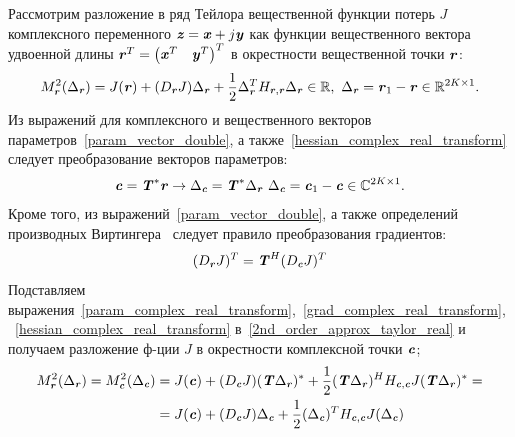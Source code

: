 Рассмотрим разложение в ряд Тейлора вещественной функции потерь $J$ комплексного переменного $\textbf{\textit{z}}=\textbf{\textit{x}}+j\textbf{\textit{y}}$ как функции вещественного вектора удвоенной длины $\textbf{\textit{r}}^T=\begin{pmatrix}
	\textbf{\textit{x}}^T & \textbf{\textit{y}}^T
\end{pmatrix}^T$ в окрестности вещественной точки $\textbf{\textit{r}}$:
\begin{align}
	M^2_{\textbf{\textit{r}}}(\Delta_{\textbf{\textit{r}}})=
	J(\textbf{\textit{r}})+(D_{\textbf{\textit{r}}}J)\Delta_{\textbf{\textit{r}}}+
	\frac{1}{2}\Delta_{\textbf{\textit{r}}}^T H_{\textbf{\textit{r}},\textbf{\textit{r}}}\Delta_{\textbf{\textit{r}}}\in\mathbb{R},\text{   }\Delta_{\textbf{\textit{r}}}=\textbf{\textit{r}}_1-\textbf{\textit{r}}\in\mathbb{R}^{2K\times 1}.
	\label{2nd_order_approx_taylor_real}
\end{align}
Из выражений для комплексного и вещественного векторов параметров~\eqref{param_vector_double}, а также~\eqref{hessian_complex_real_transform} следует преобразование векторов параметров:
\begin{equation}
	\textbf{\textit{c}}=\textbf{\textit{T}}^*\textbf{\textit{r}}\rightarrow\Delta_{\textbf{\textit{c}}}=\textbf{\textit{T}}^*\Delta_{\textbf{\textit{r}}}\text{   }\Delta_{\textbf{\textit{c}}}=\textbf{\textit{c}}_1-\textbf{\textit{c}}\in\mathbb{C}^{2K\times 1}.
	\label{param_complex_real_transform}
\end{equation}
Кроме того, из выражений~\eqref{param_vector_double}, а также определений производных Виртингера~\cite{complex_deriv} следует правило преобразования градиентов:
\begin{equation}
	(D_{\textbf{\textit{r}}}J)^T=\textbf{\textit{T}}^H(D_{\textbf{\textit{c}}}J)^T
	\label{grad_complex_real_transform}
\end{equation}
Подставляем выражения~\eqref{param_complex_real_transform},~\eqref{grad_complex_real_transform},~\eqref{hessian_complex_real_transform} в~\eqref{2nd_order_approx_taylor_real} и получаем разложение ф-ции $J$ в окрестности комплексной точки $\textbf{\textit{c}}$;
\begin{align}
	M^2_{\textbf{\textit{r}}}(\Delta_{\textbf{\textit{r}}})=
	M^2_{\textbf{\textit{c}}}(\Delta_{\textbf{\textit{c}}})&=
	J(\textbf{\textit{c}})+(D_{\textbf{\textit{c}}}J)(\textbf{\textit{T}}\Delta_{\textbf{\textit{r}}})^*+
	\frac{1}{2}(\textbf{\textit{T}}\Delta_{\textbf{\textit{r}}})^H H_{\textbf{\textit{c}},\textbf{\textit{c}} }J(\textbf{\textit{T}}\Delta_{\textbf{\textit{r}}})^*= \nonumber \\
	&=
	J(\textbf{\textit{c}})+(D_{\textbf{\textit{c}}}J)\Delta_{\textbf{\textit{c}}}+
	\frac{1}{2}(\Delta_{\textbf{\textit{c}}})^T H_{\textbf{\textit{c}},\textbf{\textit{c}} }J(\Delta_{\textbf{\textit{c}}})
	\label{2nd_order_approx_taylor_complex}
\end{align}

